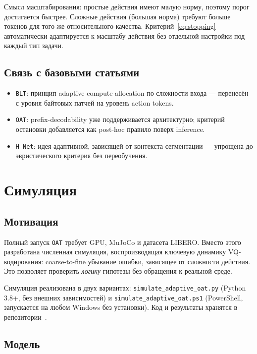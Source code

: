 \documentclass[12pt,a4paper]{article}
\begin{document}
Смысл масштабирования: простые действия имеют малую норму, поэтому порог
достигается быстрее. Сложные действия (большая норма) требуют больше токенов
для того же относительного качества. Критерий~\eqref{eq:stopping} автоматически
адаптируется к масштабу действия без отдельной настройки под каждый тип задачи.

\subsection{Связь с базовыми статьями}

\begin{itemize}[leftmargin=1.4cm]
    \item \texttt{BLT}: принцип adaptive compute allocation по сложности входа ---
          перенесён с уровня байтовых патчей на уровень action tokens.
    \item \texttt{OAT}: prefix-decodability уже поддерживается архитектурно;
          критерий остановки добавляется как post-hoc правило поверх inference.
    \item \texttt{H-Net}: идея адаптивной, зависящей от контекста сегментации ---
          упрощена до эвристического критерия без переобучения.
\end{itemize}

\section{Симуляция}

\subsection{Мотивация}

Полный запуск \texttt{OAT} требует GPU, MuJoCo и датасета LIBERO. Вместо
этого разработана численная симуляция, воспроизводящая ключевую динамику
VQ-кодирования: coarse-to-fine убывание ошибки, зависящее от сложности действия.
Это позволяет проверить \textit{логику} гипотезы без обращения к реальной среде.

Симуляция реализована в двух вариантах: \texttt{simulate\_adaptive\_oat.py}
(Python 3.8+, без внешних зависимостей) и \texttt{simulate\_adaptive\_oat.ps1}
(PowerShell, запускается на любом Windows без установки). Код и результаты
хранятся в репозитории~\cite{repo}.

\subsection{Модель}
\end{document}
